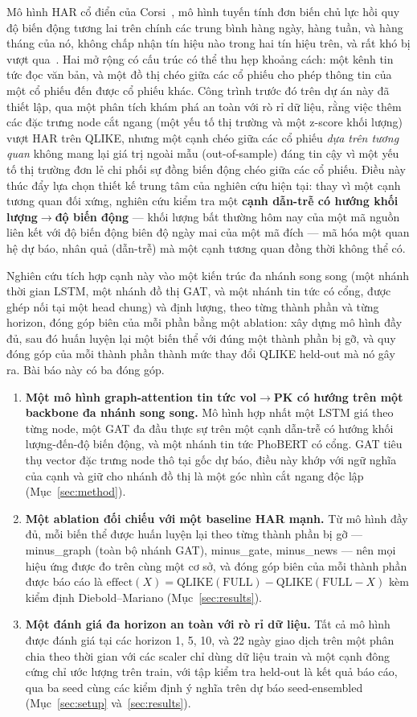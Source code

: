 \documentclass[runningheads]{llncs}
\begin{document}
Mô hình HAR cổ điển của Corsi~\cite{corsi2009}, mô hình tuyến tính đơn biến chủ lực hồi quy độ biến động
tương lai trên chính các trung bình hàng ngày, hàng tuần, và hàng tháng của nó, không chấp nhận tín hiệu
nào trong hai tín hiệu trên, và rất khó bị vượt qua~\cite{audrino2025}. Hai mở rộng có cấu trúc có thể
thu hẹp khoảng cách: một kênh tin tức đọc văn bản, và một đồ thị chéo giữa các cổ phiếu cho phép thông
tin của một cổ phiếu đến được cổ phiếu khác. Công trình trước đó trên dự án này đã thiết lập, qua một
phân tích khám phá an toàn với rò rỉ dữ liệu, rằng việc thêm các đặc trưng node cắt ngang (một yếu tố thị
trường và một z-score khối lượng) vượt HAR trên QLIKE, nhưng một cạnh chéo giữa các cổ phiếu \emph{dựa
trên tương quan} không mang lại giá trị ngoài mẫu (out-of-sample) đáng tin cậy vì một yếu tố thị trường
đơn lẻ chi phối sự đồng biến động chéo giữa các cổ phiếu. Điều này thúc đẩy lựa chọn thiết kế trung tâm
của nghiên cứu hiện tại: thay vì một cạnh tương quan đối xứng, nghiên cứu kiểm tra một \textbf{cạnh
dẫn-trễ có hướng khối lượng$\to$độ biến động} --- khối lượng bất thường hôm nay của một mã nguồn liên kết
với độ biến động biên độ ngày mai của một mã đích --- mã hóa một quan hệ dự báo, nhân quả (dẫn-trễ) mà
một cạnh tương quan đồng thời không thể có.

Nghiên cứu tích hợp cạnh này vào một kiến trúc đa nhánh song song (một nhánh thời gian LSTM, một nhánh
đồ thị GAT, và một nhánh tin tức có cổng, được ghép nối tại một head chung) và định lượng, theo từng
thành phần và từng horizon, đóng góp biên của mỗi phần bằng một ablation: xây dựng mô hình đầy đủ, sau đó
huấn luyện lại một biến thể với đúng một thành phần bị gỡ, và quy đóng góp của mỗi thành phần thành mức
thay đổi QLIKE held-out mà nó gây ra. Bài báo này có ba đóng góp.
\begin{enumerate}
\item \textbf{Một mô hình graph-attention tin tức vol$\to$PK có hướng trên một backbone đa nhánh song
song.} Mô hình hợp nhất một LSTM giá theo từng node, một GAT đa đầu thực sự trên một cạnh dẫn-trễ có
hướng khối lượng-đến-độ biến động, và một nhánh tin tức PhoBERT có cổng. GAT tiêu thụ vector đặc trưng
node thô tại gốc dự báo, điều này khớp với ngữ nghĩa của cạnh và giữ cho nhánh đồ thị là một góc nhìn
cắt ngang độc lập (Mục~\ref{sec:method}).
\item \textbf{Một ablation đối chiếu với một baseline HAR mạnh.} Từ mô hình đầy đủ, mỗi biến thể được
huấn luyện lại theo từng thành phần bị gỡ --- minus\_graph (toàn bộ nhánh GAT), minus\_gate, minus\_news
--- nên mọi hiệu ứng được đo trên cùng một cơ sở, và đóng góp biên của mỗi thành phần được báo cáo là
$\text{effect}(X)=\text{QLIKE}(\text{FULL})-\text{QLIKE}(\text{FULL}{-}X)$ kèm kiểm định
Diebold--Mariano (Mục~\ref{sec:results}).
\item \textbf{Một đánh giá đa horizon an toàn với rò rỉ dữ liệu.} Tất cả mô hình được đánh giá tại các
horizon 1, 5, 10, và 22 ngày giao dịch trên một phân chia theo thời gian với các scaler chỉ dùng dữ liệu
train và một cạnh đông cứng chỉ ước lượng trên train, với tập kiểm tra held-out là kết quả báo cáo, qua
ba seed cùng các kiểm định ý nghĩa trên dự báo seed-ensembled (Mục~\ref{sec:setup}
và~\ref{sec:results}).
\end{enumerate}
\end{document}
